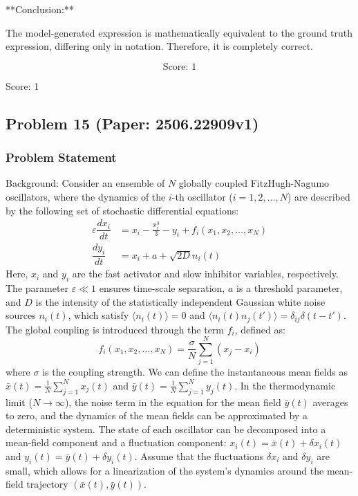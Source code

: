 \documentclass[10pt]{article}
\begin{document}
**Conclusion:**

The model-generated expression is mathematically equivalent to the ground truth expression, differing only in notation. Therefore, it is completely correct.

\[
\boxed{
\text{Score: } 1
}
\]

Score: 1

\newpage
\subsection*{Problem 15 (Paper: 2506.22909v1)}
\subsubsection*{Problem Statement}
Background:
Consider an ensemble of $N$ globally coupled FitzHugh-Nagumo oscillators, where the dynamics of the $i$-th oscillator ($i=1, 2, \ldots, N$) are described by the following set of stochastic differential equations:
\begin{align*}
\varepsilon\dfrac{dx_{i}}{dt} &= x_i - \frac{x_i^3}{3} - y_i + f_i(x_1, x_2, \ldots, x_N) \\
\dfrac{dy_i}{dt} &= x_i + a + \sqrt{2D}n_i(t)
\end{align*}
Here, $x_i$ and $y_i$ are the fast activator and slow inhibitor variables, respectively. The parameter $\varepsilon \ll 1$ ensures time-scale separation, $a$ is a threshold parameter, and $D$ is the intensity of the statistically independent Gaussian white noise sources $n_i(t)$, which satisfy $\langle n_i(t) \rangle = 0$ and $\langle n_i(t)n_j(t') \rangle = \delta_{ij}\delta(t-t')$. The global coupling is introduced through the term $f_i$, defined as:
$$ f_i(x_1, x_2, \ldots, x_N) = \frac{\sigma}{N} \sum_{j=1}^{N}(x_j - x_i) $$
where $\sigma$ is the coupling strength. We can define the instantaneous mean fields as $\bar{x}(t) = \frac{1}{N}\sum_{j=1}^{N}x_j(t)$ and $\bar{y}(t) = \frac{1}{N}\sum_{j=1}^{N}y_j(t)$. In the thermodynamic limit ($N \to \infty$), the noise term in the equation for the mean field $\bar{y}(t)$ averages to zero, and the dynamics of the mean fields can be approximated by a deterministic system. The state of each oscillator can be decomposed into a mean-field component and a fluctuation component: $x_i(t) = \bar{x}(t) + \delta x_i(t)$ and $y_i(t) = \bar{y}(t) + \delta y_i(t)$. Assume that the fluctuations $\delta x_i$ and $\delta y_i$ are small, which allows for a linearization of the system's dynamics around the mean-field trajectory $(\bar{x}(t), \bar{y}(t))$.
\end{document}
